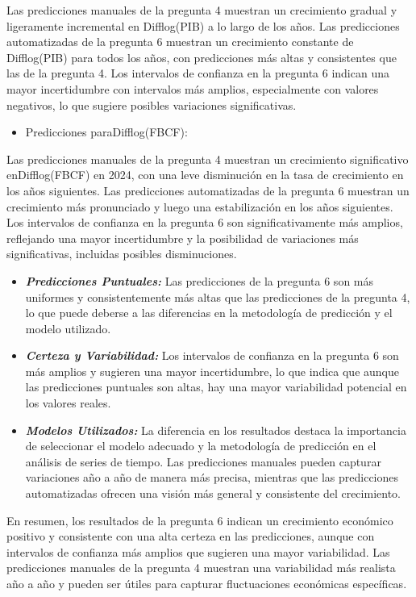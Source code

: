 \documentclass[
  12pt,
]{article}
\providecommand{\tightlist}{%
  \setlength{\itemsep}{0pt}\setlength{\parskip}{0pt}}
\begin{document}
Las predicciones manuales de la pregunta 4 muestran un crecimiento
gradual y ligeramente incremental en Difflog(PIB) a lo largo de los
años. Las predicciones automatizadas de la pregunta 6 muestran un
crecimiento constante de Difflog(PIB) para todos los años, con
predicciones más altas y consistentes que las de la pregunta 4. Los
intervalos de confianza en la pregunta 6 indican una mayor incertidumbre
con intervalos más amplios, especialmente con valores negativos, lo que
sugiere posibles variaciones significativas.

\begin{itemize}
\tightlist
\item
  Predicciones paraDifflog(FBCF):
\end{itemize}

Las predicciones manuales de la pregunta 4 muestran un crecimiento
significativo enDifflog(FBCF) en 2024, con una leve disminución en la
tasa de crecimiento en los años siguientes. Las predicciones
automatizadas de la pregunta 6 muestran un crecimiento más pronunciado y
luego una estabilización en los años siguientes. Los intervalos de
confianza en la pregunta 6 son significativamente más amplios,
reflejando una mayor incertidumbre y la posibilidad de variaciones más
significativas, incluidas posibles disminuciones.

\begin{itemize}
\tightlist
\item
  \textbf{\emph{Predicciones Puntuales:}} Las predicciones de la
  pregunta 6 son más uniformes y consistentemente más altas que las
  predicciones de la pregunta 4, lo que puede deberse a las diferencias
  en la metodología de predicción y el modelo utilizado.
\item
  \textbf{\emph{Certeza y Variabilidad:}} Los intervalos de confianza en
  la pregunta 6 son más amplios y sugieren una mayor incertidumbre, lo
  que indica que aunque las predicciones puntuales son altas, hay una
  mayor variabilidad potencial en los valores reales.
\item
  \textbf{\emph{Modelos Utilizados:}} La diferencia en los resultados
  destaca la importancia de seleccionar el modelo adecuado y la
  metodología de predicción en el análisis de series de tiempo. Las
  predicciones manuales pueden capturar variaciones año a año de manera
  más precisa, mientras que las predicciones automatizadas ofrecen una
  visión más general y consistente del crecimiento.
\end{itemize}

En resumen, los resultados de la pregunta 6 indican un crecimiento
económico positivo y consistente con una alta certeza en las
predicciones, aunque con intervalos de confianza más amplios que
sugieren una mayor variabilidad. Las predicciones manuales de la
pregunta 4 muestran una variabilidad más realista año a año y pueden ser
útiles para capturar fluctuaciones económicas específicas.
\end{document}
